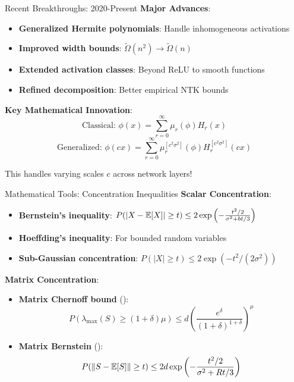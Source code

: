 \begin{frame}{Recent Breakthroughs: 2020-Present}
  \textbf{Major Advances}:
  \begin{itemize}[<+->]
    \item \textbf{Generalized Hermite polynomials}: Handle inhomogeneous activations
    \item \textbf{Improved width bounds}: $\tilde{\Omega}(n^2) \rightarrow \tilde{\Omega}(n)$
    \item \textbf{Extended activation classes}: Beyond ReLU to smooth functions
    \item \textbf{Refined decomposition}: Better empirical NTK bounds
  \end{itemize}
  
  \textbf{Key Mathematical Innovation}:
  $$\text{Classical: } \phi(x) = \sum_{r=0}^{\infty} \mu_r(\phi) H_r(x)$$
  $$\text{Generalized: } \phi(cx) = \sum_{r=0}^{\infty} \mu_r^{[c^2\sigma^2]}(\phi) H_r^{[c^2\sigma^2]}(cx)$$
  
  This handles varying scales $c$ across network layers!
\end{frame}

\begin{frame}{Mathematical Tools: Concentration Inequalities}
  \textbf{Scalar Concentration}:
  \begin{itemize}[<+->]
    \item \textbf{Bernstein's inequality}: $P(|X - \mathbb{E}[X]| \geq t) \leq 2\exp\left(-\frac{t^2/2}{\sigma^2 + bt/3}\right)$
    \item \textbf{Hoeffding's inequality}: For bounded random variables
    \item \textbf{Sub-Gaussian concentration}: $P(|X| \geq t) \leq 2\exp(-t^2/(2\sigma^2))$
  \end{itemize}
  
  \textbf{Matrix Concentration}:
  \begin{itemize}[<+->]
    \item \textbf{Matrix Chernoff bound} (\cite{Tropp2011}):
    $$P(\lambda_{\max}(S) \geq (1+\delta)\mu) \leq d \left(\frac{e^\delta}{(1+\delta)^{1+\delta}}\right)^\mu$$
    \item \textbf{Matrix Bernstein} (\cite{vershynin2018high}):
    $$P(\|S - \mathbb{E}[S]\| \geq t) \leq 2d \exp\left(-\frac{t^2/2}{\sigma^2 + Rt/3}\right)$$
  \end{itemize}
\end{frame}

